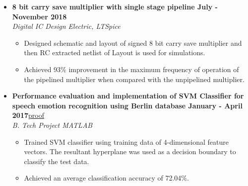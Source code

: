 \documentclass[a4paper,11pt]{article}
\newcommand{\isep}{-2 pt}
\newcommand{\spsep}{-0.75cm}
\begin{document}
\begin{itemize}
\begin{itemize}
	\end{itemize}
	
	\item \textbf{8 bit carry save multiplier with single stage pipeline \hfill July - November 2018} \\
	\emph{Digital IC Design \hfill  Electric, LTSpice} \\[\spsep]
	\begin{itemize} \itemsep \isep
		\item Designed schematic and layout of signed 8 bit carry save multiplier and then RC extracted netlist of Layout is used for simulations.
		\item Achieved 93\% improvement in the maximum frequency of operation of the pipelined multiplier when compared with the unpipelined multiplier.
	\end{itemize}
	
	\item \textbf{Performance evaluation and implementation of SVM Classifier for speech emotion recognition using Berlin database \hfill January - April 2017}\href{https://drive.google.com/open?id=1P0t_L0kyVUBKDL7uhDdbQtKr7fGCYVyx}{proof} \\
	\emph{B. Tech Project  \hfill  MATLAB} \\[\spsep]
	\begin{itemize} \itemsep \isep
		\item Trained SVM classifier using training data of 4-dimensional feature vectors. The resultant hyperplane was used as a decision boundary to classify the test data.%
		\item Achieved an average classification accuracy of 72.04\%.
	\end{itemize}
	
\end{itemize}
\pagebreak
\end{document}
